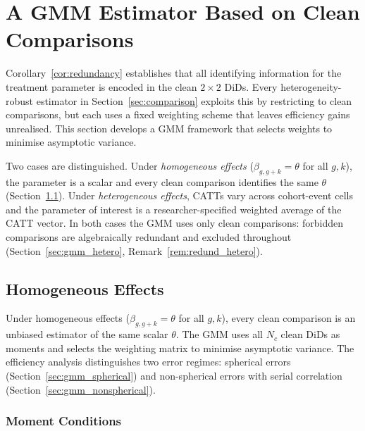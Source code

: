 \documentclass[12pt,letterpaper]{article}
\theoremstyle{remark}
\theoremstyle{definition}
\begin{document}
\section{A GMM Estimator Based on Clean Comparisons}
\label{sec:gmm}

Corollary~\ref{cor:redundancy} establishes that all identifying information
for the treatment parameter is encoded in the clean $2\times2$ DiDs. Every
heterogeneity-robust estimator in Section~\ref{sec:comparison} exploits this
by restricting to clean comparisons, but each uses a fixed weighting scheme
that leaves efficiency gains unrealised. This section develops a GMM framework
that selects weights to minimise asymptotic variance.

Two cases are distinguished. Under \emph{homogeneous effects}
($\beta_{g,g+k}=\theta$ for all $g,k$), the parameter is a scalar and every
clean comparison identifies the same $\theta$ (Section~\ref{sec:gmm_homog}).
Under \emph{heterogeneous effects}, CATTs vary across cohort-event cells and
the parameter of interest is a researcher-specified weighted average of the
CATT vector. In both cases the GMM uses only clean comparisons: forbidden
comparisons are algebraically redundant and excluded throughout
(Section~\ref{sec:gmm_hetero}, Remark~\ref{rem:redund_hetero}).

\subsection{Homogeneous Effects}
\label{sec:gmm_homog}

Under homogeneous effects ($\beta_{g,g+k}=\theta$ for all $g,k$), every
clean comparison is an unbiased estimator of the same scalar $\theta$.
The GMM uses all $N_c$ clean DiDs as moments and selects the weighting
matrix to minimise asymptotic variance. The efficiency analysis
distinguishes two error regimes: spherical errors
(Section~\ref{sec:gmm_spherical}) and non-spherical errors with serial
correlation (Section~\ref{sec:gmm_nonspherical}).

\subsubsection{Moment Conditions}
\label{sec:gmm_moments}
\end{document}
